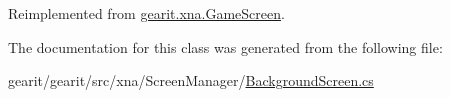 Reimplemented from \hyperlink{classgearit_1_1xna_1_1_game_screen_a6bb803502dfbd62b275c2a21d182f88e}{gearit.\+xna.\+Game\+Screen}.



The documentation for this class was generated from the following file\+:\begin{DoxyCompactItemize}
\item 
gearit/gearit/src/xna/\+Screen\+Manager/\hyperlink{_background_screen_8cs}{Background\+Screen.\+cs}\end{DoxyCompactItemize}
